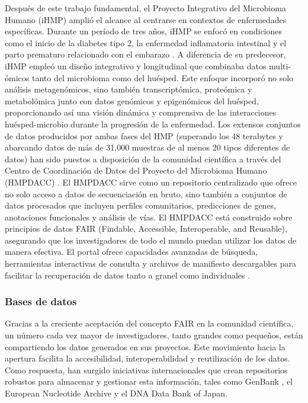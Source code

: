 Después de este trabajo fundamental, el Proyecto Integrativo del Microbioma Humano (iHMP) amplió el alcance al centrarse en contextos de enfermedades específicas. Durante un período de tres años, iHMP se enfocó en condiciones como el inicio de la diabetes tipo 2, la enfermedad inflamatoria intestinal y el parto prematuro relacionado con el embarazo \cite{integrative2014integrative}. A diferencia de su predecesor, iHMP empleó un diseño integrativo y longitudinal que combinaba datos multi-ómicos tanto del microbioma como del huésped. Este enfoque incorporó no solo análisis metagenómicos, sino también transcriptómica, proteómica y metabolómica junto con datos genómicos y epigenómicos del huésped, proporcionando así una visión dinámica y comprensiva de las interacciones huésped-microbio durante la progresión de la enfermedad. Los extensos conjuntos de datos producidos por ambas fases del HMP (superando los 48 terabytes y abarcando datos de más de 31,000 muestras de al menos 20 tipos diferentes de datos) han sido puestos a disposición de la comunidad científica a través del Centro de Coordinación de Datos del Proyecto del Microbioma Humano (HMPDACC) \cite{nih2019review}. El HMPDACC sirve como un repositorio centralizado que ofrece no solo acceso a datos de secuenciación en bruto, sino también a conjuntos de datos procesados que incluyen perfiles comunitarios, predicciones de genes, anotaciones funcionales y análisis de vías. El HMPDACC está construido sobre principios de datos FAIR (Findable, Accessible, Interoperable, and Reusable), asegurando que los investigadores de todo el mundo puedan utilizar los datos de manera efectiva. El portal ofrece capacidades avanzadas de búsqueda, herramientas interactivas de consulta y archivos de manifiesto descargables para facilitar la recuperación de datos tanto a granel como individuales \cite{creasy2021hmpdacc}.


\subsubsection{Bases de datos}

Gracias a la creciente aceptación del concepto FAIR en la comunidad científica, un número cada vez mayor de investigadores, tanto grandes como pequeños, están compartiendo los datos generados en sus proyectos. Este movimiento hacia la apertura facilita la accesibilidad, interoperabilidad y reutilización de los datos. Como respuesta, han surgido iniciativas internacionales que crean repositorios robustos para almacenar y gestionar esta información, tales como GenBank \cite{sayers2025genbank}, el European Nucleotide Archive \cite{o2025european} y el DNA Data Bank of Japan\cite{kodama2025ddbj}.


